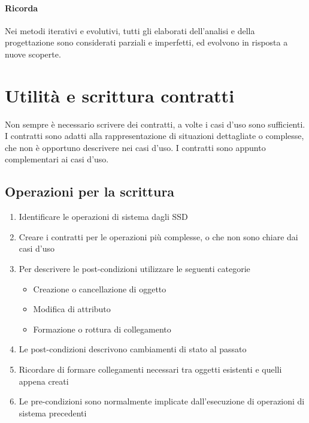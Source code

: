 \paragraph*{Ricorda} Nei metodi iterativi e evolutivi, tutti gli elaborati dell'analisi e della progettazione
sono considerati parziali e imperfetti, ed evolvono in risposta a nuove scoperte.
\section{Utilità e scrittura contratti}
Non sempre è necessario scrivere dei contratti, a volte i casi d'uso sono sufficienti.
I contratti sono adatti alla rappresentazione di situazioni dettagliate o complesse, che non è opportuno
descrivere nei casi d'uso. I contratti sono appunto complementari ai casi d'uso.
\subsection*{Operazioni per la scrittura}
\begin{enumerate}
    \item Identificare le operazioni di sistema dagli SSD
    \item Creare i contratti per le operazioni più complesse, o che non sono chiare dai casi d'uso
    \item Per descrivere le post-condizioni utilizzare le seguenti categorie \begin{itemize}
        \item Creazione o cancellazione di oggetto
        \item Modifica di attributo
        \item Formazione o rottura di collegamento
    \end{itemize}
    \item Le post-condizioni descrivono cambiamenti di stato al passato
    \item Ricordare di formare collegamenti necessari tra oggetti esistenti e quelli appena creati
    \item Le pre-condizioni sono normalmente implicate dall'esecuzione di operazioni di sistema precedenti
\end{enumerate}
